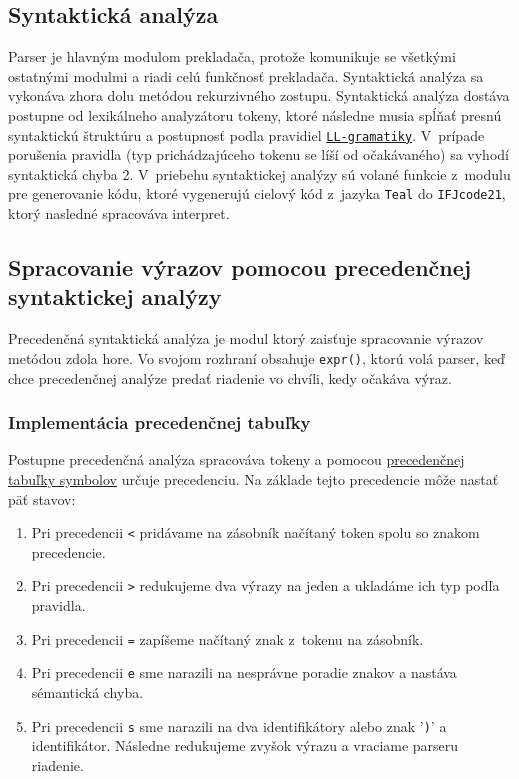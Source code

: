 \documentclass[a4paper, 11pt]{article}
\begin{document}
    \subsection{Syntaktická analýza}
    Parser je hlavným modulom prekladača, protože komunikuje se všetkými ostatnými modulmi a riadi celú funkčnosť
    prekladača. Syntaktická analýza sa vykonáva zhora dolu metódou rekurzivného zostupu.
    Syntaktická analýza dostáva postupne od lexikálneho analyzátoru tokeny, ktoré následne musia spĺňať presnú
    syntaktickú štruktúru a postupnosť podla pravidiel \hyperref[sec: LL-gramatika]{\texttt{LL-gramatiky}}.
    V~prípade porušenia pravidla (typ prichádzajúceho tokenu se líší od očakávaného) sa vyhodí syntaktická chyba 2.
    V~priebehu syntaktickej analýzy sú volané funkcie z~modulu pre generovanie kódu, ktoré vygenerujú cielový kód
    z~jazyka \texttt{Teal} do \texttt{IFJcode21}, ktorý nasledné spracováva interpret.


    \subsection{Spracovanie výrazov pomocou precedenčnej syntaktickej analýzy}
    Precedenčná syntaktická analýza je modul ktorý zaisťuje spracovanie výrazov metódou zdola hore.
    Vo svojom rozhraní obsahuje \texttt{expr()}, ktorú volá parser, keď chce precedenčnej analýze predať
    riadenie vo chvíli, kedy očakáva výraz.
    \newpage
    \subsubsection{Implementácia precedenčnej tabuľky}
    Postupne precedenčná analýza spracováva tokeny a pomocou \hyperref[sec: prec-tabulka]{precedenčnej tabuľky symbolov}
    určuje precedenciu. Na základe tejto precedencie môže nastať päť stavov:
    \begin{enumerate}
        \item Pri precedencii \texttt{<} pridávame na zásobník načítaný token spolu so znakom precedencie.
        \item Pri precedencii \texttt{>} redukujeme dva výrazy na jeden a ukladáme ich typ podľa pravidla.
        \item Pri precedencii \texttt{=} zapíšeme načítaný znak z~tokenu na zásobník.
        \item Pri precedencii \texttt{e} sme narazili na nesprávne poradie znakov a nastáva sémantická chyba.
        \item Pri precedencii \texttt{s} sme narazili na dva identifikátory alebo znak '\texttt{)}' a identifikátor. Následne redukujeme zvyšok výrazu a vraciame parseru riadenie.
    \end{enumerate}
\end{document}
